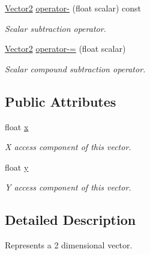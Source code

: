 \begin{DoxyCompactItemize}
\hyperlink{classchaos_1_1gfx_1_1_vector2}{Vector2} \hyperlink{classchaos_1_1gfx_1_1_vector2_a0f4f7749c5841b8ff46b5b60c1114863}{operator-\/} (float scalar) const 
\begin{DoxyCompactList}\small\item\em Scalar subtraction operator. \end{DoxyCompactList}\item 
\hyperlink{classchaos_1_1gfx_1_1_vector2}{Vector2} \hyperlink{classchaos_1_1gfx_1_1_vector2_a658877f9e37d57f11d796b58b870f29f}{operator-\/=} (float scalar)
\begin{DoxyCompactList}\small\item\em Scalar compound subtraction operator. \end{DoxyCompactList}\end{DoxyCompactItemize}
\subsection*{Public Attributes}
\begin{DoxyCompactItemize}
\item 
\hypertarget{classchaos_1_1gfx_1_1_vector2_a98989a2809ad9c6ac3091550ad5f5118}{float \hyperlink{classchaos_1_1gfx_1_1_vector2_a98989a2809ad9c6ac3091550ad5f5118}{x}}\label{classchaos_1_1gfx_1_1_vector2_a98989a2809ad9c6ac3091550ad5f5118}

\begin{DoxyCompactList}\small\item\em X access component of this vector. \end{DoxyCompactList}\item 
\hypertarget{classchaos_1_1gfx_1_1_vector2_adf4d8ed8e49c84c2fe1596c2b9d55d49}{float \hyperlink{classchaos_1_1gfx_1_1_vector2_adf4d8ed8e49c84c2fe1596c2b9d55d49}{y}}\label{classchaos_1_1gfx_1_1_vector2_adf4d8ed8e49c84c2fe1596c2b9d55d49}

\begin{DoxyCompactList}\small\item\em Y access component of this vector. \end{DoxyCompactList}\end{DoxyCompactItemize}


\subsection{Detailed Description}
Represents a 2 dimensional vector. 

